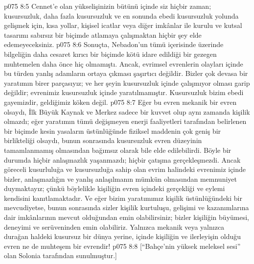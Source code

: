 \vs p075 8:5 Cennet’e olan yükselişinizin bütünü içinde siz hiçbir zaman; kusursuzluk, daha fazla kusursuzluk ve en sonunda ebedi kusursuzluk yolunda gelişmek için, kısa yollar, kişisel icatlar veya diğer imkânlar ile kurulu ve kutsal tasarımı sabırsız bir biçimde atlamaya çalışmaktan hiçbir şey elde edemeyeceksiniz.
\vs p075 8:6 Sonuçta, Nebadon’un tümü içerisinde üzerinde bilgeliğin daha cesaret kırıcı bir biçimde kötü idare edildiği bir gezegen muhtemelen daha önce hiç olmamıştı. Ancak, evrimsel evrenlerin olayları içinde bu türden yanlış adamların ortaya çıkması şaşırtıcı değildir. Bizler çok devasa bir yaratımın birer parçasıyız; ve her şeyin kusursuzluk içinde çalışmıyor olması garip değildir; evrenimiz kusursuzluk içinde yaratılmamıştır. Kusursuzluk bizim ebedi gayemizdir, geldiğimiz köken değil.
\vs p075 8:7 Eğer bu evren mekanik bir evren olsaydı, İlk Büyük Kaynak ve Merkez sadece bir kuvvet olup aynı zamanda kişilik olmazdı; eğer yaratımın tümü değişmeyen enerji faaliyetleri tarafından belirlenen bir biçimde kesin yasaların üstünlüğünde fiziksel maddenin çok geniş bir birlikteliği olsaydı, bunun sonrasında kusursuzluk evren düzeyinin tamamlanmamış olmasından bağımsız olarak bile elde edilebilirdi. Böyle bir durumda hiçbir anlaşmazlık yaşanmazdı; hiçbir çatışma gerçekleşmezdi. Ancak göreceli kusurluluğa ve kusursuzluğa sahip olan evrim halindeki evrenimiz içinde bizler, anlaşmazlığın ve yanlış anlaşılmanın mümkün olmasından memnuniyet duymaktayız; çünkü böylelikle kişiliğin evren içindeki gerçekliği ve eylemi kendisini kanıtlamaktadır. Ve eğer bizim yaratımımız kişilik üstünlüğündeki bir mevcudiyetse, bunun sonrasında sizler kişilik kurtuluşu, gelişimi ve kazanımlarına dair imkânlarının mevcut olduğundan emin olabilirsiniz; bizler kişiliğin büyümesi, deneyimi ve serüveninden emin olabiliriz. Yalnızca mekanik veya yalnızca durağan haldeki kusursuz bir dünya yerine, içinde kişiliğin ve ilerleyişin olduğu evren ne de muhteşem bir evrendir!
\vs p075 8:8 [“Bahçe’nin {yüksek} meleksel sesi” olan Solonia tarafından sunulmuştur.]
